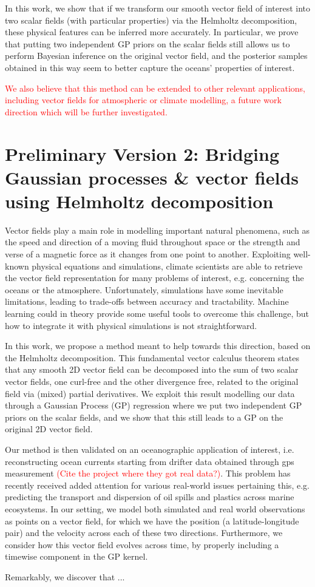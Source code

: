 \documentclass[11pt,a4paper]{article}
\begin{document}
In this work, we show that if we transform our smooth vector field of interest into two scalar fields (with particular properties) via the Helmholtz decomposition, these physical features can be inferred more accurately. In particular, we prove that putting two independent GP priors on the scalar fields still allows us to perform Bayesian inference on the original vector field, and the posterior samples obtained in this way seem to better capture the oceans' properties of interest.

\textcolor{red}{We also believe that this method can be extended to other relevant applications, including vector fields for atmospheric or climate modelling, a future work direction which will be further investigated.}

\newpage

\section*{Preliminary Version 2: Bridging Gaussian processes \& vector fields using Helmholtz decomposition}

Vector fields play a main role in modelling important natural phenomena, such as the speed and direction of a moving fluid throughout space or the strength and verse of a magnetic force as it changes from one point to another. Exploiting well-known physical equations and simulations, climate scientists are able to retrieve the vector field representation for many problems of interest, e.g. concerning the oceans or the atmosphere. Unfortunately, simulations have some inevitable limitations, leading to trade-offs between accuracy and tractability. Machine learning could in theory provide some useful tools to overcome this challenge, but how to integrate it with physical simulations is not straightforward. 

In this work, we propose a method meant to help towards this direction, based on the Helmholtz decomposition. This fundamental vector calculus theorem states that any smooth 2D vector field can be decomposed into the sum of two scalar vector fields, one curl-free and the other divergence free, related to the original field via (mixed) partial derivatives. We exploit this result modelling our data through a Gaussian Process (GP) regression where we put two independent GP priors on the scalar fields, and we show that this still leads to a GP on the original 2D vector field.  

 Our method is then validated on an oceanographic application of interest, i.e. reconstructing ocean currents starting from drifter data obtained through gps measurement \textcolor{red}{(Cite the project where they got real data?)}. This problem has recently received added attention for various real-world issues pertaining this, e.g. predicting the transport and dispersion of oil spills and plastics across marine ecosystems. In our setting, we model both simulated and real world observations as points on a vector field, for which we have the position (a latitude-longitude pair) and the velocity across each of these two directions. Furthermore, we consider how this vector field evolves across time, by properly including a timewise component in the GP kernel. 
 
 Remarkably, we discover that ...
 
 \newpage
 


 
\end{document}
